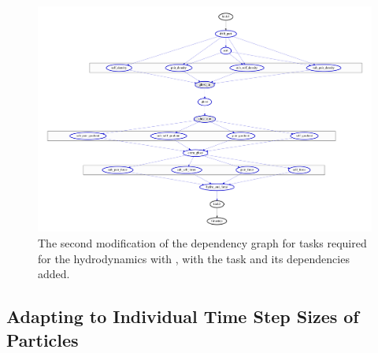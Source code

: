 \begin{figure}
\centering
\includegraphics[width=\linewidth]{figures/Meshless/tasks_hydro_second_order.pdf}%
\caption{
The second modification of the dependency graph for tasks required for the hydrodynamics with
\swift, with the  task and its dependencies added.
}
\label{fig:dependency-graph-second-order}
\end{figure}








\subsection{Adapting to Individual Time Step Sizes of Particles}


